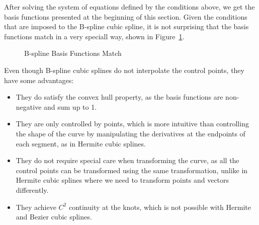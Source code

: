 After solving the system of equations defined by the conditions above, we get the basis functions presented at the beginning of this section. Given the conditions that are imposed to the B-spline cubic spline, it is not surprising that the basis functions match in a very speciall way, shown in Figure~\ref{fig:bspline_basis_match}.
\begin{figure}
    \centering
    \caption{B-spline Basis Functions Match}
    \label{fig:bspline_basis_match}
\end{figure}

Even though B-spline cubic splines do not interpolate the control points, they have some advantages:
\begin{itemize}
    \item They do satisfy the convex hull property, as the basis functions are non-negative and sum up to 1.
    \item They are only controlled by points, which is more intuitive than controlling the shape of the curve by manipulating the derivatives at the endpoints of each segment, as in Hermite cubic splines.
    \item They do not require special care when transforming the curve, as all the control points can be transformed using the same transformation, unlike in Hermite cubic splines where we need to transform points and vectors differently.
    \item They achieve $C^2$ continuity at the knots, which is not possible with Hermite and Bezier cubic splines.
\end{itemize}


